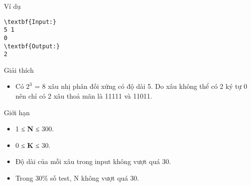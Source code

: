 Ví dụ
\begin{verbatim}
\textbf{Input:}
5 1
0
\textbf{Output:}
2\end{verbatim}
Giải thích
\begin{itemize}
	\item Có $2^{3}$ = 8 xâu nhị phân đối xứng có độ dài 5. Do xâu không thể có 2 ký tự 0 nên chỉ có 2 xâu thoả mãn là 11111 và 11011.
\end{itemize}
Giới hạn
\begin{itemize}
	\item 1 ≤ \textbf{ N } ≤ 300.
	\item 0 ≤ \textbf{ K } ≤ 30.
	\item Độ dài của mỗi xâu trong input không vượt quá 30.
	\item Trong 30\% số test, N không vượt quá 30.
\end{itemize}